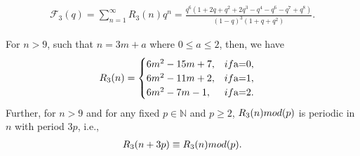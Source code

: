 \documentclass[10pt,a4paper]{amsart}
\begin{document}
		\begin{align}
			\mathscr{F}_3(q)= \sum_{n=1}^{\infty} R_3(n) q^n = \frac{q^6(1+2q+q^2+2q^3-q^4-q^6-q^7+q^8)}{(1-q)^3(1+q+q^2)}. \label{ScrF3GF}
 		\end{align}

	\begin{theorem}\label{R3thmexk} 
		For $n>9$, such that $n=3m+a$ where $0\leq a\leq 2$, then, we have
		\begin{align}\label{R3formula}
			R_3(n) &=
			\begin{cases}
				6m^2 -15m+7, & \textup{if $a=0$,}\\
				6m^2 -11m+2, & \textup{if $a=1$,}\\
				6m^2 -7m-1, & \textup{if $a=2$.}
			\end{cases}
		\end{align}
		Further, for $n>9$ and for any fixed $p \in \mathbb{N}$ and $p\geq2$, $R_3(n) \textup{ mod }(p)$ is periodic in $n$ with period $3p$, i.e.,
		\begin{align*}
			R_3(n+3p) \equiv R_3(n) \textup{ mod } (p).
		\end{align*}
	\end{theorem}
\end{document}
